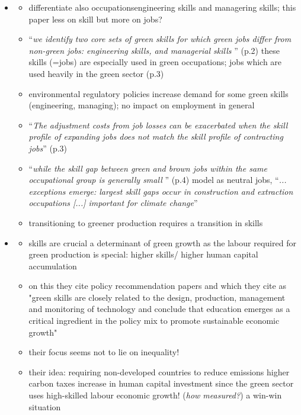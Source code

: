 \begin{itemize}
	\item \cite{Vona2018EnvironmentalExploration}
	\begin{itemize}
		\item differentiate also occupations\ar engineering skills and managering skills; this  paper less on skill but more on jobs?
		\item ``\textit{we identify two core sets of green skills for which green jobs differ from non-green jobs: engineering skills, and managerial skills }'' (p.2) \ar these skills (=jobs) are especially used in green occupations; \ar jobs which are used heavily in the green sector (p.3)
		\item environmental regulatory policies increase demand for some green skills (engineering, managing); no impact on employment in general
		\item ``\textit{The adjustment costs from job losses can be exacerbated when the skill profile of expanding jobs does not match the skill profile of contracting jobs}'' (p.3)
		\item ``\textit{while the skill gap between green and brown jobs within the same occupational group is generally small }'' (p.4) \ar model as neutral jobs, ``\textit{... exceptions emerge: largest skill gaps occur in construction and extraction occupations [...] important for climate change}''
		\item transitioning to greener production requires a transition in skills
	\end{itemize}
	\item \cite{Borissov2019CarbonDevelopment}
	\begin{itemize}
		\item skills are crucial a determinant of green growth as the labour required for green production is special: higher skills/ higher human capital accumulation
		\item on this they cite policy recommendation papers and \cite{Vona2018EnvironmentalExploration} which they cite as "green skills are closely related to the design, production, management and monitoring of technology and conclude that education emerges as a critical ingredient in the policy mix to promote sustainable economic growth"
		\item their focus seems not to lie on inequality!
		\item their idea: requiring non-developed countries to reduce emissions \ar higher carbon taxes \ar increase in human capital investment since the green sector uses high-skilled labour \ar economic growth! (\textit{how measured?}) \ar a win-win situation

\end{itemize}
\end{itemize}
